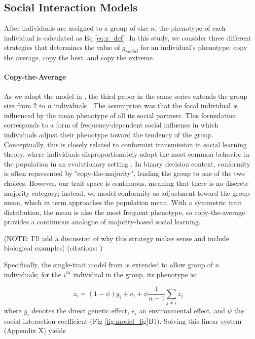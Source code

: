 \documentclass{article}
\begin{document}
\subsection{Social Interaction Models}
\label{sec:interaction_models}
After individuals are assigned to a group of size $n$, the phenotype of each individual is calculated as Eq \ref{eq:z_def}. In this study, we consider three different strategies that determines the value of $g_{social}$ for an individual's phenotype: copy the average, copy the best, and copy the extreme. 

\paragraph{Copy-the-Average} As we adopt the model in \cite{Moore1997}, the third paper in the same series extends the group size from 2 to $n$ individuals \cite{McGlothlin2010}. The assumption was that the focal individual is influenced by the mean phenotype of all its social partners. This formulation corresponds to a form of frequency-dependent social influence in which individuals adjust their phenotype toward the tendency of the group. Conceptually, this is closely related to conformist transmission in social learning theory, where individuals disproportionately adopt the most common behavior in the population in an evolutionary setting \cite{Boyd1985}. In binary decision context, conformity is often represented by "copy-the-majority", leading the group to one of the two choices. However, our trait space is continuous, meaning that there is no discrete majority category; instead, we model conformity as adjustment toward the group mean, which in term approaches the population mean. With a symmetric trait distribution, the mean is also the most frequent phenotype, so copy-the-average provides a continuous analogue of majority-based social learning.

(NOTE: I'll add a discussion of why this strategy makes sense and include biological examples) (citations: \cite{Laland2004})


Specifically, the single-trait model from \cite{Moore1997} is extended to allow group of $n$ individuals; for the $i^{th}$ individual in the group, its phenotype is: 

\begin{equation}
z_i = (1-\psi)g_i + e_i + \psi \frac{1}{n-1} \sum_{j \ne i} z_j 
\label{eq:system}
\end{equation}
where $g_i$ denotes the direct genetic effect, $e_i$ an environmental effect, and $\psi$ the social interaction coefficient (Fig \ref{fig:model_fig}B1). Solving this linear system (Appendix X) yields
\end{document}
